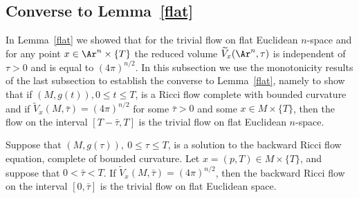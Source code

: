 \subsection{Converse to Lemma~{\ref{flat}}}

In Lemma~\ref{flat} we showed that for the trivial flow on flat
Euclidean $n$-space and for any point $x\in \Ar^n\times \{T\}$ the
reduced volume $\widetilde V_x(\Ar^n,\tau)$ is independent of
$\tau>0$  and is equal to $(4\pi)^{n/2}$. In this subsection we use
the monotonicity results of the last subsection to establish the
converse to Lemma~\ref{flat}, namely to show that if $(M,g(t)),0\le
t\le T$, is a Ricci flow complete with bounded curvature and if
$\widetilde V_x(M,\bar\tau)=(4\pi)^{n/2}$ for some $\bar\tau>0$ and
some $x\in M\times\{T\}$, then the flow on the interval
$[T-\bar\tau,T]$ is the trivial flow on flat Euclidean $n$-space.



\begin{proposition}
\label{prop:reduced-volume-rigidity}\label{4picase}
Suppose that $(M,g(\tau)),\ 0\le \tau\le T$,
 is a solution to the backward Ricci flow
equation, complete of bounded curvature. Let $x=(p,T)\in M\times
\{T\}$, and suppose that $0<\bar\tau<T$. If $\widetilde
V_x(M,\bar\tau)=(4\pi)^{n/2}$, then the backward Ricci flow on the
interval $[0,\bar\tau]$ is the trivial flow on flat Euclidean space.
\end{proposition}

